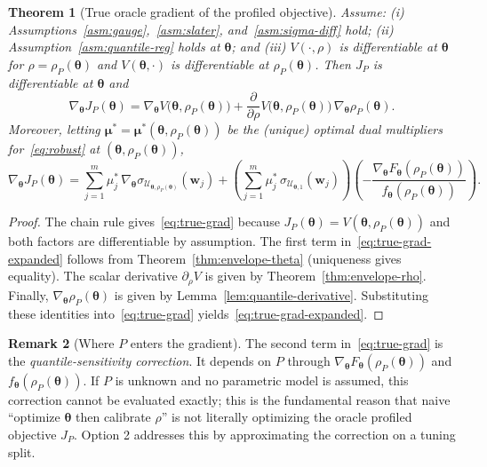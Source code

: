 \documentclass[11pt]{article}
\newcommand{\cU}{\mathcal{U}}
\newcommand{\btheta}{\bm{\theta}}
\newcommand{\bw}{\bm{w}}
\newcommand{\bmu}{\bm{\mu}}
\theoremstyle{plain}
\newtheorem{theorem}{Theorem}
\theoremstyle{definition}
\newtheorem{remark}[theorem]{Remark}
\begin{document}
\begin{theorem}[True oracle gradient of the profiled objective]\label{thm:true-oracle-grad}
Assume:
(i) Assumptions~\ref{asm:gauge},~\ref{asm:slater}, and~\ref{asm:sigma-diff} hold;
(ii) Assumption~\ref{asm:quantile-reg} holds at $\btheta$; and
(iii) $V(\cdot,\rho)$ is differentiable at $\btheta$ for $\rho=\rho_P(\btheta)$ and $V(\btheta,\cdot)$ is differentiable at $\rho_P(\btheta)$.
Then $J_P$ is differentiable at $\btheta$ and
\begin{equation}\label{eq:true-grad}
\boxed{
\nabla_{\btheta}J_P(\btheta)
=
\nabla_{\btheta}V\big(\btheta,\rho_P(\btheta)\big)
+
\frac{\partial}{\partial\rho}V\big(\btheta,\rho_P(\btheta)\big)\,\nabla_{\btheta}\rho_P(\btheta).
}
\end{equation}
Moreover, letting $\bmu^*=\bmu^*(\btheta,\rho_P(\btheta))$ be the (unique) optimal dual multipliers for~\eqref{eq:robust} at $(\btheta,\rho_P(\btheta))$,
\begin{equation}\label{eq:true-grad-expanded}
\boxed{
\nabla_{\btheta}J_P(\btheta)
=
\sum_{j=1}^m \mu_j^*\,\nabla_{\btheta}\sigma_{\cU_{\btheta,\rho_P(\btheta)}}(\bw_j)
+
\left(\sum_{j=1}^m \mu_j^*\,\sigma_{\cU_{\btheta,1}}(\bw_j)\right)
\left(
-\frac{\nabla_{\btheta}F_{\btheta}(\rho_P(\btheta))}{f_{\btheta}(\rho_P(\btheta))}
\right).
}
\end{equation}
\end{theorem}

\begin{proof}
The chain rule gives~\eqref{eq:true-grad} because $J_P(\btheta)=V(\btheta,\rho_P(\btheta))$ and both factors are differentiable by assumption.
The first term in~\eqref{eq:true-grad-expanded} follows from Theorem~\ref{thm:envelope-theta} (uniqueness gives equality).
The scalar derivative $\partial_\rho V$ is given by Theorem~\ref{thm:envelope-rho}.
Finally, $\nabla_{\btheta}\rho_P(\btheta)$ is given by Lemma~\ref{lem:quantile-derivative}.
Substituting these identities into~\eqref{eq:true-grad} yields~\eqref{eq:true-grad-expanded}.
\end{proof}

\begin{remark}[Where $P$ enters the gradient]\label{rem:P-enters}
The second term in~\eqref{eq:true-grad} is the \emph{quantile-sensitivity correction}.
It depends on $P$ through $\nabla_{\btheta}F_{\btheta}(\rho_P(\btheta))$ and $f_{\btheta}(\rho_P(\btheta))$.
If $P$ is unknown and no parametric model is assumed, this correction cannot be evaluated exactly; this is the fundamental reason that naive ``optimize $\btheta$ then calibrate $\rho$'' is not literally optimizing the oracle profiled objective $J_P$.
Option 2 addresses this by approximating the correction on a tuning split.
\end{remark}
\end{document}
